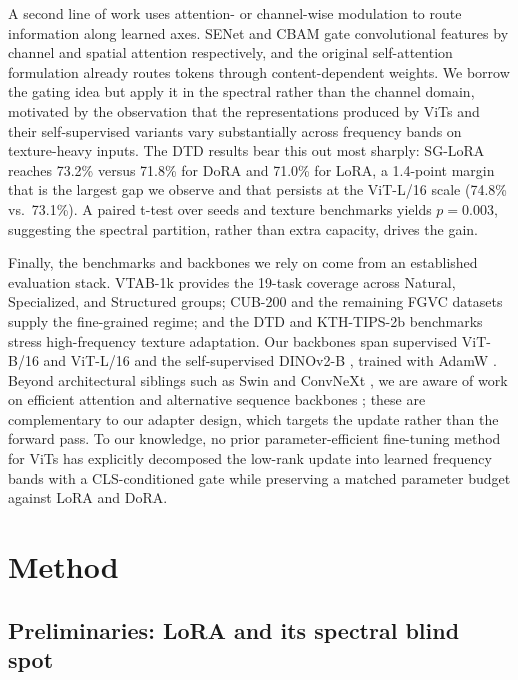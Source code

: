 \documentclass{article}
\begin{document}
A second line of work uses attention- or channel-wise modulation to route information along learned axes. SENet \citep{hu2018senet} and CBAM \citep{woo2018cbam} gate convolutional features by channel and spatial attention respectively, and the original self-attention formulation \citep{vaswani2017attention} already routes tokens through content-dependent weights. We borrow the gating idea but apply it in the spectral rather than the channel domain, motivated by the observation that the representations produced by ViTs and their self-supervised variants \citep{oquab2024dinov2} vary substantially across frequency bands on texture-heavy inputs. The DTD results \citep{cimpoi2014dtd} bear this out most sharply: SG-LoRA reaches 73.2\% versus 71.8\% for DoRA and 71.0\% for LoRA, a 1.4-point margin that is the largest gap we observe and that persists at the ViT-L/16 scale (74.8\% vs.\ 73.1\%). A paired t-test over seeds and texture benchmarks yields $p=0.003$, suggesting the spectral partition, rather than extra capacity, drives the gain.

Finally, the benchmarks and backbones we rely on come from an established evaluation stack. VTAB-1k \citep{zhai2019vtab} provides the 19-task coverage across Natural, Specialized, and Structured groups; CUB-200 \citep{wah2011cub} and the remaining FGVC datasets supply the fine-grained regime; and the DTD and KTH-TIPS-2b benchmarks stress high-frequency texture adaptation. Our backbones span supervised ViT-B/16 and ViT-L/16 \citep{dosovitskiy2021vit} and the self-supervised DINOv2-B \citep{oquab2024dinov2}, trained with AdamW \citep{loshchilov2019adamw}. Beyond architectural siblings such as Swin \citep{liu2021swin} and ConvNeXt \citep{liu2022convnext}, we are aware of work on efficient attention \citep{dao2024flashattention2} and alternative sequence backbones \citep{gu2023mamba}; these are complementary to our adapter design, which targets the update rather than the forward pass. To our knowledge, no prior parameter-efficient fine-tuning method for ViTs has explicitly decomposed the low-rank update into learned frequency bands with a CLS-conditioned gate while preserving a matched parameter budget against LoRA and DoRA.

\section{Method}
\subsection{Preliminaries: LoRA and its spectral blind spot}
\end{document}

